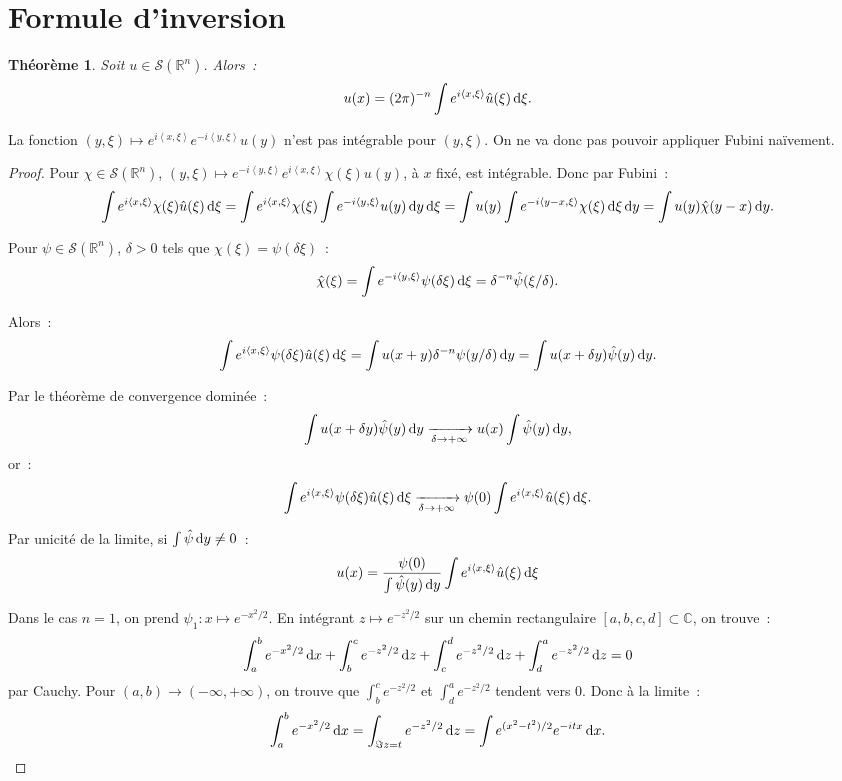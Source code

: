 \documentclass{report}
\newcommand{\C}{{\mathbb C}}
\newcommand{\R}{{\mathbb R}}
\newcommand{\scpr}[2]{\left\langle#1, #2\right\rangle}
\newcommand{\pinfty}{{+\infty}}
\newcommand{\minfty}{{-\infty}}
\newcommand{\dx}{\dif x}
\newtheorem{thm}{Théorème}[chapter]
\theoremstyle{definition}
\theoremstyle{remark}
\begin{document}
\section{Formule d'inversion}

\begin{thm}\label{thm:inversion Fourier} Soit $u \in \mathcal S(\R^n)$. Alors~:
\begin{equation}\label{eq:inversion Fourier}
	u(x) = (2\pi)^{-n}\int e^{i\scpr x\xi}\hat u(\xi)\dif\xi.
\end{equation}
\end{thm}

La fonction $(y, \xi) \mapsto e^{i\scpr x\xi}e^{-i\scpr y\xi}u(y)$ n'est pas intégrable pour $(y, \xi)$. On ne va donc pas pouvoir appliquer Fubini naïvement.

\begin{proof} Pour $\chi \in \mathcal S(\R^n)$, $(y, \xi) \mapsto e^{-i\scpr y\xi}e^{i\scpr x\xi}\chi(\xi)u(y)$, à $x$ fixé, est intégrable. Donc par Fubini~:
\[\int e^{i\scpr x\xi}\chi(\xi)\hat u(\xi)\dif\xi = \int e^{i\scpr x\xi}\chi(\xi)\int e^{-i\scpr y\xi}u(y)\dif y\dif\xi
	= \int u(y)\int e^{-i\scpr {y-x}\xi}\chi(\xi)\dif\xi \dif y = \int u(y)\hat \chi(y-x)\dif y.\]

Pour $\psi \in \mathcal S(\R^n)$, $\delta > 0$ tels que $\chi(\xi) = \psi(\delta\xi)$~:
\[\hat \chi(\xi) = \int e^{-i\scpr y\xi}\psi(\delta\xi)\dif\xi = \delta^{-n}\hat \psi(\xi/\delta).\]

Alors~:
\[\int e^{i\scpr x\xi}\psi(\delta\xi)\hat u(\xi)\dif\xi = \int u(x+y)\delta^{-n}\psi(y/\delta)\dif y = \int u(x+\delta y)\hat \psi(y)\dif y.\]

Par le théorème de convergence dominée~:
\[\int u(x+\delta y)\hat \psi(y)\dif y \xrightarrow[\delta \to \pinfty]{} u(x)\int \hat \psi(y)\dif y,\]
or~:
\[\int e^{i\scpr x\xi}\psi(\delta \xi)\hat u(\xi)\dif\xi \xrightarrow[\delta \to \pinfty]{} \psi(0)\int e^{i\scpr x\xi}\hat u(\xi)\dif\xi.\]

Par unicité de la limite, si $\int \hat \psi \dif y\neq 0$~:
\[u(x) = \frac {\psi(0)}{\int\hat \psi(y)\dif y}\int e^{i\scpr x\xi}\hat u(\xi)\dif\xi\]

Dans le cas $n=1$, on prend $\psi_1 : x \mapsto e^{-x^2/2}$. En intégrant $z \mapsto e^{-z^2/2}$ sur un chemin rectangulaire $[a,b,c,d] \subset \C$, on trouve~:
\[\int_a^b e^{-x^2/2}\dx + \int_b^c e^{-z^2/2}\dif z + \int_c^d e^{-z^2/2}\dif z + \int_d^a e^{-z^2/2}\dif z = 0\]
par Cauchy. Pour $(a, b) \to (\minfty, \pinfty)$, on trouve que $\int_b^c e^{-z^2/2}$ et $\int_d^a e^{-z^2/2}$ tendent vers $0$. Donc à la limite~:
\[\int_a^b e^{-x^2/2}\dx = \int_{\Im z = t}e^{-z^2/2}\dif z = \int e^{(x^2-t^2)/2}e^{-itx}\dx.\]


\end{proof}
\end{document}
